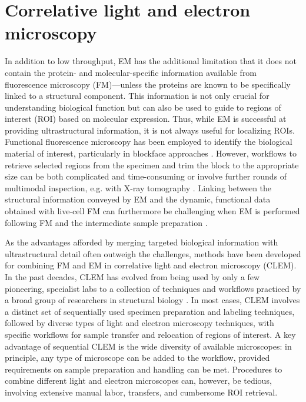 \section{Correlative light and electron microscopy}
\label{sec:1_CLEM}

In addition to low throughput, EM has the additional limitation that it does not contain the protein- and molecular-specific information available from fluorescence microscopy (FM)---unless the proteins are known to be specifically linked to a structural component. This information is not only crucial for understanding biological function but can also be used to guide to regions of interest (ROI) based on molecular expression. Thus, while EM is successful at providing ultrastructural information, it is not always useful for localizing ROIs. Functional fluorescence microscopy has been employed to identify the biological material of interest, particularly in blockface approaches \cite{karreman2016fast}. However, workflows to retrieve selected regions from the specimen and trim the block to the appropriate size can be both complicated and time-consuming or involve further rounds of multimodal inspection, e.g. with X-ray tomography \cite{karreman2016intravital}. Linking between the structural information conveyed by EM and the dynamic, functional data obtained with live-cell FM can furthermore be challenging when EM is performed following FM and the intermediate sample preparation \cite{de2015correlated}.

As the advantages afforded by merging targeted biological information with ultrastructural detail often outweigh the challenges, methods have been developed for combining FM and EM in correlative light and electron microscopy (CLEM). In the past decades, CLEM has evolved from being used by only a few pioneering, specialist labs to a collection of techniques and workflows practiced by a broad group of researchers in structural biology \cite{de2015correlated, ando20182018}. In most cases, CLEM involves a distinct set of sequentially used specimen preparation and labeling techniques, followed by diverse types of light and electron microscopy techniques, with specific workflows for sample transfer and relocation of regions of interest. A key advantage of sequential CLEM is the wide diversity of available microscopes: in principle, any type of microscope can be added to the workflow, provided requirements on sample preparation and handling can be met. Procedures to combine different light and electron microscopes can, however, be tedious, involving extensive manual labor, transfers, and cumbersome ROI retrieval.


